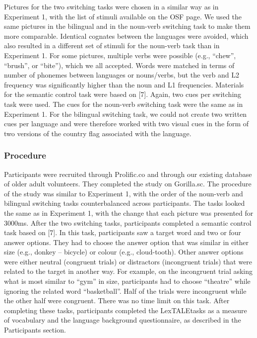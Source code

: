 \documentclass[
]{article}
\begin{document}
Pictures for the two switching tasks were chosen in a similar way as in Experiment 1, with the list of stimuli available on the OSF page. We used the same pictures in the bilingual and in the noun-verb switching task to make them more comparable. Identical cognates between the languages were avoided, which also resulted in a different set of stimuli for the noun-verb task than in Experiment 1. For some pictures, multiple verbs were possible (e.g., ``chew'', ``brush'', or ``bite''), which we all accepted. Words were matched in terms of number of phonemes between languages or nouns/verbs, but the verb and L2 frequency was significantly higher than the noun and L1 frequencies. Materials for the semantic control task were based on {[}7{]}. Again, two cues per switching task were used. The cues for the noun-verb switching task were the same as in Experiment 1. For the bilingual switching task, we could not create two written cues per language and were therefore worked with two visual cues in the form of two versions of the country flag associated with the language.

\hypertarget{procedure-1}{%
\subsubsection{Procedure}\label{procedure-1}}

Participants were recruited through Prolific.co and through our existing database of older adult volunteers. They completed the study on Gorilla.sc. The procedure of the study was similar to Experiment 1, with the order of the noun-verb and bilingual switching tasks counterbalanced across participants. The tasks looked the same as in Experiment 1, with the change that each picture was presented for 3000ms. After the two switching tasks, participants completed a semantic control task based on {[}7{]}. In this task, participants saw a target word and two or four answer options. They had to choose the answer option that was similar in either size (e.g., donkey -- bicycle) or colour (e.g., cloud-tooth). Other answer options were either neutral (congruent trials) or distractors (incongruent trials) that were related to the target in another way. For example, on the incongruent trial asking what is most similar to ``gym'' in size, participants had to choose ``theatre'' while ignoring the related word ``basketball''. Half of the trials were incongruent while the other half were congruent. There was no time limit on this task. After completing these tasks, participants completed the LexTALEtasks as a measure of vocabulary and the language background questionnaire, as described in the Participants section.
\end{document}
